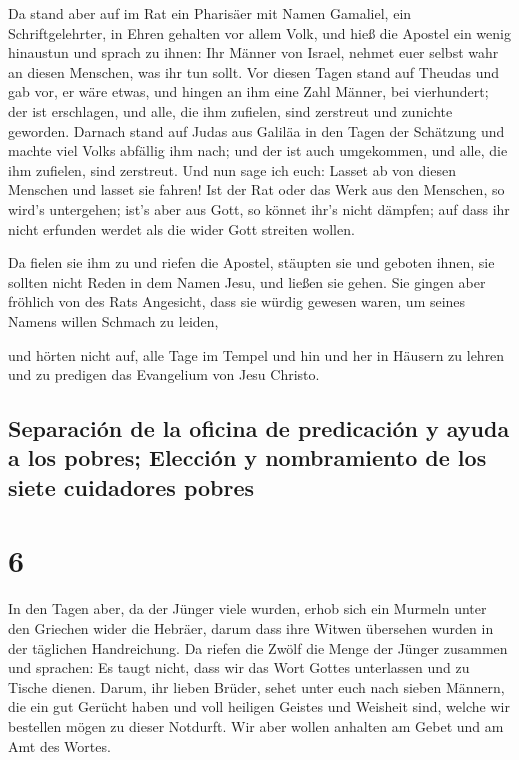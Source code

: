  Da stand aber auf im Rat ein Pharisäer mit Namen
Gamaliel, ein Schriftgelehrter, in Ehren gehalten vor allem Volk, und
hieß die Apostel ein wenig hinaustun  und sprach zu
ihnen: Ihr Männer von Israel, nehmet euer selbst wahr an diesen
Menschen, was ihr tun sollt.  Vor diesen Tagen stand auf
Theudas und gab vor, er wäre etwas, und hingen an ihm eine Zahl Männer,
bei vierhundert; der ist erschlagen, und alle, die ihm zufielen, sind
zerstreut und zunichte geworden.  Darnach stand auf Judas
aus Galiläa in den Tagen der Schätzung und machte viel Volks abfällig
ihm nach; und der ist auch umgekommen, und alle, die ihm zufielen, sind
zerstreut.  Und nun sage ich euch: Lasset ab von diesen
Menschen und lasset sie fahren! Ist der Rat oder das Werk aus den
Menschen, so wird's untergehen;  ist's aber aus Gott, so
könnet ihr's nicht dämpfen; auf dass ihr nicht erfunden werdet als die
wider Gott streiten wollen.

 Da fielen sie ihm zu und riefen die Apostel, stäupten
sie und geboten ihnen, sie sollten nicht Reden in dem Namen Jesu, und
ließen sie gehen.  Sie gingen aber fröhlich von des Rats
Angesicht, dass sie würdig gewesen waren, um seines Namens willen
Schmach zu leiden,

 und hörten nicht auf, alle Tage im Tempel und hin und
her in Häusern zu lehren und zu predigen das Evangelium von Jesu
Christo.

\hypertarget{separaciuxf3n-de-la-oficina-de-predicaciuxf3n-y-ayuda-a-los-pobres-elecciuxf3n-y-nombramiento-de-los-siete-cuidadores-pobres}{%
\subsection{Separación de la oficina de predicación y ayuda a los
pobres; Elección y nombramiento de los siete cuidadores
pobres}\label{separaciuxf3n-de-la-oficina-de-predicaciuxf3n-y-ayuda-a-los-pobres-elecciuxf3n-y-nombramiento-de-los-siete-cuidadores-pobres}}

\hypertarget{section-5}{%
\section{6}\label{section-5}}

 In den Tagen aber, da der Jünger viele wurden, erhob sich
ein Murmeln unter den Griechen wider die Hebräer, darum dass ihre Witwen
übersehen wurden in der täglichen Handreichung.  Da riefen
die Zwölf die Menge der Jünger zusammen und sprachen: Es taugt nicht,
dass wir das Wort Gottes unterlassen und zu Tische dienen.
 Darum, ihr lieben Brüder, sehet unter euch nach sieben
Männern, die ein gut Gerücht haben und voll heiligen Geistes und
Weisheit sind, welche wir bestellen mögen zu dieser Notdurft.
 Wir aber wollen anhalten am Gebet und am Amt des Wortes.

